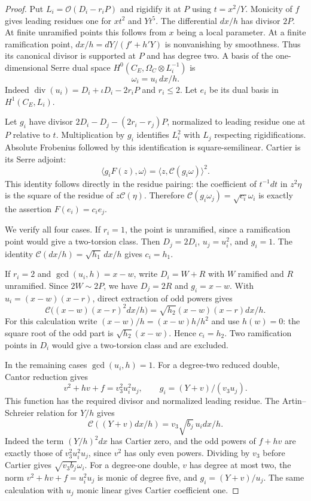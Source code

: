 \documentclass[11pt]{article}
\begin{document}
\begin{proof}
Put $L_i=\mathcal O(D_i-r_iP)$ and rigidify it at $P$ using
$t=x^2/Y$. Monicity of $f$ gives leading residues one for $xt^2$
and $Yt^5$. The differential $dx/h$ has divisor $2P$.
At finite unramified points this follows from $x$ being a local
parameter. At a finite ramification point,
$dx/h=dY/(f'+h'Y)$ is nonvanishing by smoothness.
Thus its canonical divisor is supported at $P$ and has degree two.
A basis of the one-dimensional Serre dual space
$H^0(C_E,\Omega_C\otimes L_i^{-1})$ is
\[
                            \omega_i=u_i\,dx/h.
\]
Indeed $\operatorname{div}(u_i)=D_i+\iota D_i-2r_iP$ and $r_i\le2$.
Let $e_i$ be its dual basis in $H^1(C_E,L_i)$.

Let $g_i$ have divisor $2D_i-D_j-(2r_i-r_j)P$, normalized to
leading residue one at $P$ relative to $t$.
Multiplication by $g_i$ identifies $L_i^2$ with $L_j$ respecting
rigidifications. Absolute Frobenius followed by this identification
is square-semilinear. Cartier is its Serre adjoint:
\[
 \langle g_iF(z),\omega\rangle
             =\langle z,\mathcal C(g_i\omega)\rangle^2.
\]
This identity follows directly in the residue pairing: the coefficient
of $t^{-1}dt$ in $z^2\eta$ is the square of the residue of
$z\mathcal C(\eta)$. Therefore
$\mathcal C(g_i\omega_j)=\sqrt{c_i}\omega_i$ is exactly the assertion
$F(e_i)=c_i e_j$.

We verify all four cases.
If $r_i=1$, the point is unramified, since a ramification point would
give a two-torsion class. Then $D_j=2D_i$, $u_j=u_i^2$, and $g_i=1$.
The identity $\mathcal C(dx/h)=\sqrt{h_1}\,dx/h$ gives $c_i=h_1$.

If $r_i=2$ and $\gcd(u_i,h)=x-w$, write $D_i=W+R$ with $W$
ramified and $R$ unramified. Since $2W\sim2P$, we have $D_j=2R$
and $g_i=x-w$. With $u_i=(x-w)(x-r)$, direct extraction of odd
powers gives
\[
 \mathcal C\bigl((x-w)(x-r)^2dx/h\bigr)
             =\sqrt{h_2}(x-w)(x-r)dx/h.
\]
For this calculation write $(x-w)/h=(x-w)h/h^2$ and use $h(w)=0$:
the square root of the odd part is $\sqrt{h_2}(x-w)$.
Hence $c_i=h_2$. Two ramification points in $D_i$ would give a
two-torsion class and are excluded.

In the remaining cases $\gcd(u_i,h)=1$.
For a degree-two reduced double, Cantor reduction gives
\[
 v^2+hv+f=v_3^2u_i^2u_j,\qquad
                     g_i=(Y+v)/(v_3u_j).
\]
This function has the required divisor and normalized leading residue.
The Artin--Schreier relation for $Y/h$ gives
\[
 \mathcal C((Y+v)dx/h)=v_3\sqrt{b_j}\,u_i dx/h.
\]
Indeed the term $(Y/h)^2dx$ has Cartier zero, and the odd powers of
$f+hv$ are exactly those of $v_3^2u_i^2u_j$, since $v^2$ has only
even powers. Dividing by $v_3$ before Cartier gives
$\sqrt{v_3b_j}\omega_i$.
For a degree-one double, $v$ has degree at most two, the norm
$v^2+hv+f=u_i^2u_j$ is monic of degree five, and
$g_i=(Y+v)/u_j$. The same calculation with $u_j$ monic linear
gives Cartier coefficient one.


\end{proof}
\end{document}
